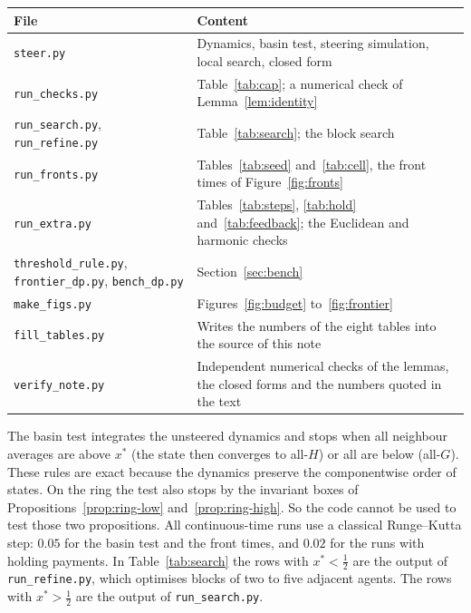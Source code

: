 \documentclass[11pt,a4paper]{article}
\theoremstyle{definition}
\theoremstyle{plain}
\newcommand{\xs}{x^{*}}
\begin{document}
\begin{center}\small
\begin{tabular}{p{}p{}}
\toprule
File & Content\\
\midrule
\texttt{steer.py} & Dynamics, basin test, steering simulation, local search, closed form\\
\texttt{run\_checks.py} & Table~\ref{tab:cap}; a numerical check of Lemma~\ref{lem:identity}\\
\texttt{run\_search.py}, \texttt{run\_refine.py} & Table~\ref{tab:search}; the block search\\
\texttt{run\_fronts.py} & Tables~\ref{tab:seed} and~\ref{tab:cell}, the front times of Figure~\ref{fig:fronts}\\
\texttt{run\_extra.py} & Tables~\ref{tab:steps}, \ref{tab:hold} and~\ref{tab:feedback}; the Euclidean and harmonic checks\\
\texttt{threshold\_rule.py}, \texttt{frontier\_dp.py}, \texttt{bench\_dp.py} & Section~\ref{sec:bench}\\
\texttt{make\_figs.py} & Figures~\ref{fig:budget} to~\ref{fig:frontier}\\
\texttt{fill\_tables.py} & Writes the numbers of the eight tables into the source of this note\\
\texttt{verify\_note.py} & Independent numerical checks of the lemmas, the closed forms and the numbers quoted in the text\\
\bottomrule
\end{tabular}
\end{center}

The basin test integrates the unsteered dynamics and stops when all neighbour averages are above $\xs$ (the state then converges to all-$H$) or all are below (all-$G$). These rules are exact because the dynamics preserve the componentwise order of states. On the ring the test also stops by the invariant boxes of Propositions~\ref{prop:ring-low} and~\ref{prop:ring-high}. So the code cannot be used to test those two propositions. All continuous-time runs use a classical Runge--Kutta step: $0.05$ for the basin test and the front times, and $0.02$ for the runs with holding payments. In Table~\ref{tab:search} the rows with $\xs<\tfrac12$ are the output of \texttt{run\_refine.py}, which optimises blocks of two to five adjacent agents. The rows with $\xs>\tfrac12$ are the output of \texttt{run\_search.py}.
\end{document}
